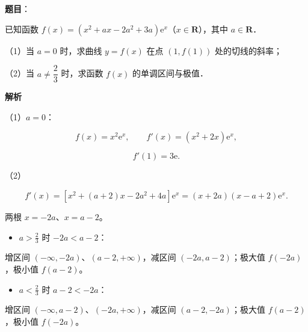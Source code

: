 \begin{answer}

\textbf{题目}：

已知函数 $f(x)=(x^2+ax-2a^2+3a)\mathrm e^x$（$x\in\mathbf R$），其中 $a\in\mathbf R$．

（1）当 $a=0$ 时，求曲线 $y=f(x)$ 在点 $(1,f(1))$ 处的切线的斜率；

（2）当 $a\neq\dfrac23$ 时，求函数 $f(x)$ 的单调区间与极值．

\textbf{解析}

（1）$a=0$：

\nopagebreak[4]
\[f(x)=x^2\mathrm e^x,\qquad f'(x)=(x^2+2x)\mathrm e^x,\]

\nopagebreak[4]
\[f'(1)=3\mathrm e .\]

（2）

\nopagebreak[4]
\[f'(x)=\left[x^2+(a+2)x-2a^2+4a\right]\mathrm e^x
=(x+2a)(x-a+2)\mathrm e^x .\]

两根 $x=-2a$、$x=a-2$。

\begin{itemize}
\item $a>\frac23$ 时 $-2a<a-2$：
\end{itemize}

  增区间 $(-\infty,-2a)$、$(a-2,+\infty)$，减区间 $(-2a,a-2)$；极大值 $f(-2a)$，极小值 $f(a-2)$。

\begin{itemize}
\item $a<\frac23$ 时 $a-2<-2a$：
\end{itemize}

  增区间 $(-\infty,a-2)$、$(-2a,+\infty)$，减区间 $(a-2,-2a)$；极大值 $f(a-2)$，极小值 $f(-2a)$。


\end{answer}
